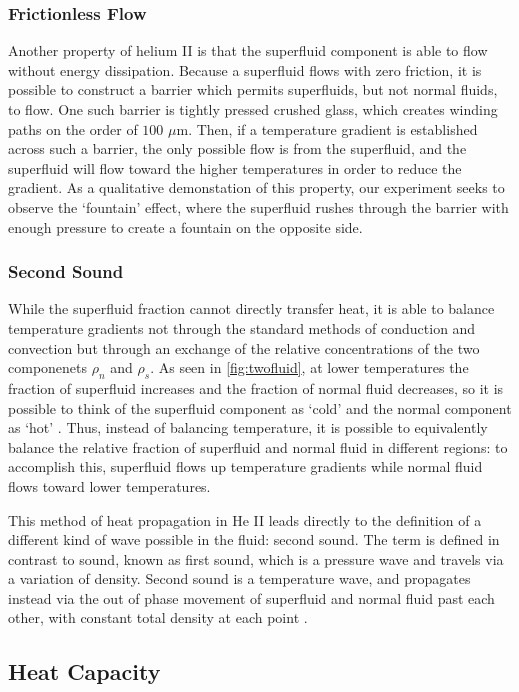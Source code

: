 \subsubsection{Frictionless Flow}\label{frictionlessflow}
Another property of helium II is that the superfluid component is able
to flow without energy dissipation. Because a superfluid flows with zero
friction, it is possible to construct a barrier which permits
superfluids, but not normal fluids, to flow. One such barrier is tightly pressed
crushed glass, which creates winding paths on the order of $100$
$\mu$m. Then, if a temperature gradient is established across such a
barrier, the only possible flow is from the superfluid, and the superfluid
will flow toward the higher temperatures in order to reduce the
gradient. As a qualitative demonstation of this property, our
experiment seeks to observe the `fountain' effect, where the
superfluid rushes through the barrier with enough pressure to create a
fountain on the opposite side.

\subsubsection{Second Sound}\label{secondsound}
While the superfluid fraction cannot directly transfer heat, it
is able to balance temperature gradients not through the standard
methods of conduction and convection but through an exchange of the
relative concentrations of the two componenets $\rho_n$ and
$\rho_s$. As seen in \ref{fig:twofluid}, at lower temperatures the
fraction of superfluid increases and the fraction of normal fluid
decreases, so it is possible to think of the superfluid component as
`cold' and the normal component as `hot' \cite{atkins}. Thus, instead
of balancing temperature, it is possible to equivalently balance the
relative fraction of superfluid and normal fluid in different regions:
to accomplish this, superfluid flows up temperature gradients while
normal fluid flows toward lower temperatures.

This method of heat propagation in He II leads directly to the
definition of a different kind of wave possible in the fluid: second
sound. The term is defined in contrast to sound, known as first sound,
which is a pressure wave and travels via a variation of
density. Second sound is a temperature wave, and propagates instead
via the out of phase movement of superfluid and normal fluid past each
other, with constant total density at each point \cite{atkins}. 

\subsection{Heat Capacity}\label{heatcapacity}

